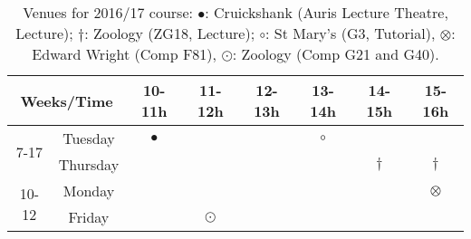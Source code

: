 \documentclass[12pts,a4paper,amsmath,amssymb,floatfix]{article}%
\begin{document}
\begin{table}[h]
\begin{center}
\begin{tabular}{ c || c | c c c c c c}
\hline\hline
\multicolumn{2}{c}{\bf Weeks/Time} & {\bf 10-11h} & {\bf 11-12h} & {\bf 12-13h} & {\bf 13-14h} & {\bf 14-15h} & {\bf 15-16h}  \\
\hline\hline
\multirow{2}{*}{7-17}  & Tuesday    & $\bullet$   &              &              &   $\circ$    &              &               \\
                       & Thursday   &             &              &              &              &   $\dagger$  &   $\dagger$   \\
\hline 
\multirow{2}{*}{10-12} & Monday     &             &              &              &              &              &   $\otimes$ \\
                       & Friday     &             &  $\odot$     &              &              &              &             \\
\hline
\end{tabular}
\end{center}
\caption{Venues for 2016/17 course: $\bullet$: Cruickshank (Auris Lecture Theatre, Lecture); $\dagger$: Zoology (ZG18, Lecture); $\circ$: St Mary's (G3, Tutorial), $\otimes$: Edward Wright (Comp F81), $\odot$: Zoology (Comp G21 and G40).}
\label{table:timetable}
\end{table}
\end{document}
